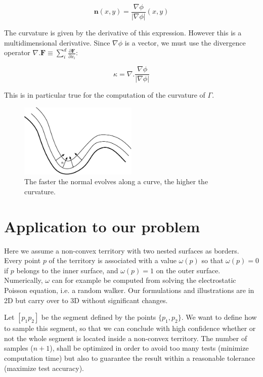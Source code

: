 \documentclass[11pt,a4paper]{article}
\begin{document}
	\begin{equation}
	\mathbf{n}(x,y) = \frac{\nabla \phi}{|\nabla \phi|}(x,y)
	\end{equation}
	
	The curvature is given by the derivative of this expression. However this is a multidimensional derivative. Since $\nabla \phi$ is a vector, we must use the divergence operator $\nabla . \mathbf{F} \equiv \sum_i^d \frac{\partial \mathbf{F}}{\partial x_i}$:
	
	\begin{equation}
	\kappa = \nabla . \frac{\nabla \phi}{|\nabla \phi|}
	\end{equation}
	
	This is in particular true for the computation of the curvature of $\Gamma$. 
	
		\begin{figure}
			\centering
			\includegraphics[width=0.5\textwidth]{Drawings/Distance.pdf}
			\caption{The faster the normal evolves along a curve, the higher the curvature.}
		\end{figure}
		
	\section{Application to our problem}
	
Here we assume a non-convex territory with two nested surfaces as borders. Every point $p$ of the territory is associated with a value $\omega(p)$ so that $\omega(p) = 0$ if $p$ belongs to the inner surface, and $\omega(p) = 1$ on the outer surface. Numerically, $\omega$ can for example be computed from solving the electrostatic Poisson equation, i.e. a random walker. Our formulations and illustrations are in 2D but carry over to 3D without significant changes.


Let $[p_1p_2]$ be the segment defined by the points $\{p_1, p_2\}$. We want to define how to sample this segment, so that we can conclude with high confidence whether or not the whole segment is located inside a non-convex territory. The number of samples ($n + 1$), shall be optimized in order to avoid too many tests (minimize computation time) but also to guarantee the result within a reasonable tolerance (maximize test accuracy).
\end{document}
